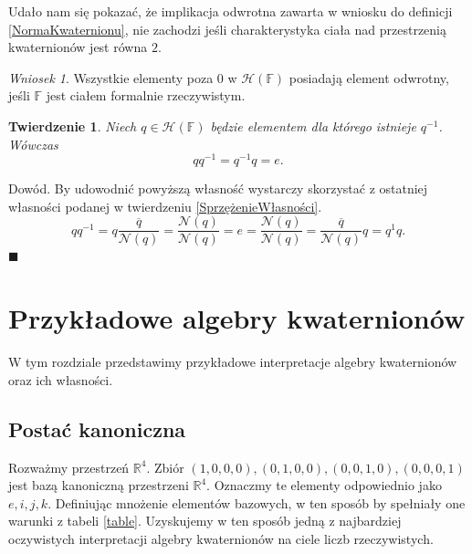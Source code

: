 \documentclass[a4paper,twoside,11pt,reqno]{mwrep}
\theoremstyle{plain} \newtheorem{twr}{Twierdzenie}
\theoremstyle{plain} \newtheorem{lem}{Lemat}
\theoremstyle{definition} \newtheorem{defi}{Definicja}
\theoremstyle{remark} \newtheorem*{wni}{Wniosek}
\theoremstyle{definition} \newtheorem{uwaga}{Uwaga}
\theoremstyle{definition}\newtheorem{prz}{Przykład}
\newenvironment{dowod}{\par\vspace{0.1cm}\par{\sc Dowód.}}{\hfill $\blacksquare$\par\vspace{0.4cm}\par}
\begin{document}
Udało nam się pokazać, że implikacja odwrotna zawarta 
w wniosku do definicji \ref{NormaKwaternionu}, nie zachodzi jeśli charakterystyka ciała nad przestrzenią kwaternionów jest równa $2$. 

\begin{wni}
Wszystkie elementy poza $0$ w $\mathcal{H}\left( \mathbb{F}\right)$ posiadają
element odwrotny, jeśli $\mathbb{F}$ jest ciałem formalnie rzeczywistym.
\end{wni}

\begin{twr}
Niech $q \in \mathcal{H}\left( \mathbb{F}\right)$ będzie elementem dla którego istnieje $q^{-1}$.
Wówczas $$qq^{-1} = q^{-1}q=e.$$
\end{twr}
\begin{dowod}
By udowodnić powyższą własność wystarczy skorzystać z ostatniej własności podanej w twierdzeniu 
\ref{SprzężenieWłasności}.
$$qq^{-1} =q\frac{\overline{q}}{\mathcal{N}(q)} = \frac{\mathcal{N}(q)}{\mathcal{N}(q)}=e =
\frac{\mathcal{N}(q)}{\mathcal{N}(q)}= \frac{\overline{q}}{\mathcal{N}(q)}q =  q^{1}q. $$
\end{dowod}

\section{Przykładowe algebry kwaternionów}
W tym rozdziale przedstawimy przykładowe interpretacje algebry kwaternionów oraz ich własności.

\subsection{Postać kanoniczna}
Rozważmy przestrzeń $\mathbb{R}^4$. Zbiór ${(1,0,0,0),(0,1,0,0),(0,0,1,0),(0,0,0,1)}$
jest bazą kanoniczną przestrzeni $\mathbb{R}^4$. Oznaczmy te elementy odpowiednio jako $e,i,j,k$.
Definiując mnożenie elementów bazowych, w ten sposób by spełniały one warunki z
tabeli \ref{table}. Uzyskujemy w ten sposób jedną z najbardziej oczywistych interpretacji algebry kwaternionów
na ciele liczb rzeczywistych. %
\end{document}
